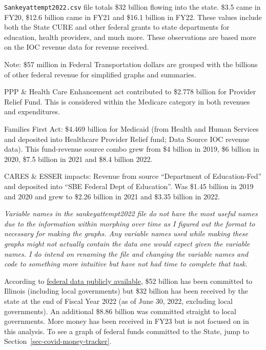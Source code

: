 \documentclass[
  letterpaper,
  DIV=11,
  numbers=noendperiod]{scrreport}
\begin{document}
\texttt{Sankeyattempt2022.csv} file totals \$32 billion flowing into the
state. \$3.5 came in FY20, \$12.6 billion came in FY21 and \$16.1
billion in FY22. These values include both the State CURE and other
federal grants to state departments for education, health providers, and
much more. These observations are based more on the IOC revenue data for
revenue received.

Note: \$57 million in Federal Transportation dollars are grouped with
the billions of other federal revenue for simplified graphs and
summaries.

PPP \& Health Care Enhancement act contributed to \$2.778 billion for
Provider Relief Fund. This is considered within the Medicare category in
both revenues and expenditures.

Families First Act: \$4.469 billion for Medicaid (from Health and Human
Services and deposited into Healthcare Provider Relief fund; Data Source
IOC revenue data). This fund-revenue source combo grew from \$4 billion
in 2019, \$6 billion in 2020, \$7.5 billion in 2021 and \$8.4 billion
2022.

CARES \& ESSER impacts: Revenue from source ``Department of
Education-Fed'' and deposited into ``SBE Federal Dept of Education''.
Was \$1.45 billion in 2019 and 2020 and grew to \$2.26 billion in 2021
and \$3.35 billion in 2022.

\begin{tcolorbox}[enhanced jigsaw, coltitle=black, titlerule=0mm, leftrule=.75mm, colbacktitle=quarto-callout-note-color!10!white, arc=.35mm, rightrule=.15mm, opacityback=0, colframe=quarto-callout-note-color-frame, toptitle=1mm, opacitybacktitle=0.6, bottomtitle=1mm, title=\textcolor{quarto-callout-note-color}{\faInfo}\hspace{0.5em}{Note}, colback=white, breakable, toprule=.15mm, left=2mm, bottomrule=.15mm]

\emph{Variable names in the sankeyattempt2022 file do not have the most
useful names due to the information within morphing over time as I
figured out the format to necessary for making the graphs. Any variable
names used while making these graphs might not actually contain the data
one would expect given the variable names. I do intend on renaming the
file and changing the variable names and code to something more
intuitive but have not had time to complete that task.}

\end{tcolorbox}

According to \href{covidmoneytracker.org}{federal data publicly
available}, \$52 billion has been committed to Illinois (including local
governments) but \$32 billion has been received by the state at the end
of Fiscal Year 2022 (as of June 30, 2022, excluding local governments).
An additional \$8.86 billion was committed straight to local
governments. More money has been received in FY23 but is not focused on
in this analysis. To see a graph of federal funds committed to the
State, jump to Section~\ref{sec-covid-money-tracker}.
\end{document}

